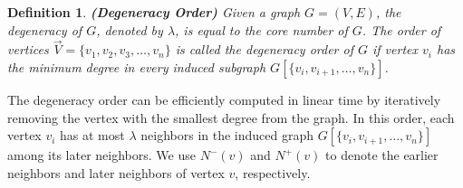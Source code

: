 \documentclass[sigconf, nonacm]{acmart}
\newtheorem{definition}{Definition}%
\begin{document}
\begin{definition}
\textit{
{\textbf{(Degeneracy Order)}}
Given a graph $G = (V, E)$, the degeneracy of $G$, denoted by $\lambda$,  is equal to the core number of $G$. The order of vertices $\overrightarrow{V} = \{v_1, v_2, v_3, \ldots, v_n\}$ is called the degeneracy order of $G$ if vertex $v_i$ has the minimum degree in every induced subgraph $G[\{v_i, v_{i+1}, \ldots, v_n\}]$.
}
\end{definition}

The degeneracy order can be efficiently computed in linear time by iteratively removing the vertex with the smallest degree from the graph. In this order, each vertex $v_i$ has at most $\lambda$ neighbors in the induced graph $G[\{v_i, v_{i+1}, \ldots, v_n\}]$ among its later neighbors. We use $N^-(v)$ and $N^+(v)$ to denote the earlier neighbors and later neighbors of vertex $v$, respectively.
\end{document}
